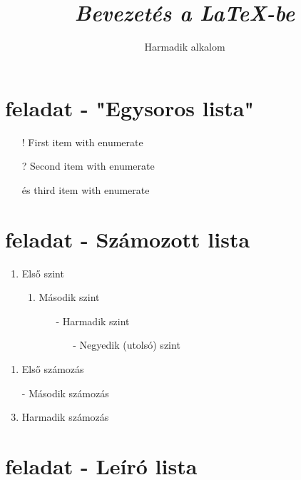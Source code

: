 \documentclass{article}
\begin{document}
	\begin{titlepage}
		\title{\Huge{\textit{Bevezetés a \LaTeX -be}}}
		\author{\Large{Harmadik alkalom}}
		\maketitle
	\end{titlepage}

\tableofcontents
\clearpage

\section{feladat - "Egysoros lista"}
\begin{enumerate}
	\item [!]First item with enumerate
	\item [?]Second item with enumerate
	\item [és]third item with enumerate
\end{enumerate}

\section{feladat - Számozott lista}
\begin{enumerate}
	\item Első szint
	\begin{enumerate}
		\item Második szint
		\begin{enumerate}
			\item [-]Harmadik szint
			\begin{enumerate}
				\item [-]Negyedik (utolsó) szint
			\end{enumerate}
		\end{enumerate}
	\end{enumerate}
\end{enumerate}

\hulipsum[2]

\begin{enumerate}[label=\textbullet]
	\item Első számozás
	\item [-]Második számozás
	\item Harmadik számozás
\end{enumerate}
\clearpage

\section{feladat - Leíró lista}
\begin{description}[align=parleft,%
	leftmargin=*,widest={hosszabb}]
	\item[slanted]
	\item[rövid cimke] \hulipsum[2]
	\item[hosszú cimke!] \hulipsum[3]
\end{description}
\clearpage
\end{document}
